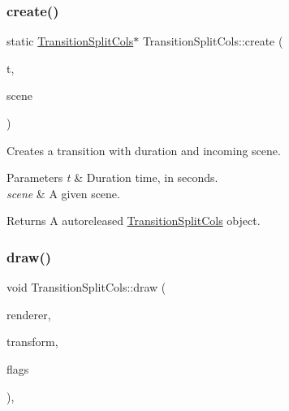 \subsubsection{\texorpdfstring{create()}{create()}\hspace{0.1cm}{\footnotesize\ttfamily [2/2]}}
{\footnotesize\ttfamily static \hyperlink{classTransitionSplitCols}{Transition\+Split\+Cols}$\ast$ Transition\+Split\+Cols\+::create (\begin{DoxyParamCaption}\item[{float}]{t,  }\item[{\hyperlink{classScene}{Scene} $\ast$}]{scene }\end{DoxyParamCaption})\hspace{0.3cm}{\ttfamily [static]}}

Creates a transition with duration and incoming scene.


\begin{DoxyParams}{Parameters}
{\em t} & Duration time, in seconds. \\
\hline
{\em scene} & A given scene. \\
\hline
\end{DoxyParams}
\begin{DoxyReturn}{Returns}
A autoreleased \hyperlink{classTransitionSplitCols}{Transition\+Split\+Cols} object. 
\end{DoxyReturn}
\mbox{\label{classTransitionSplitCols_af9a2190cb947a62c0d04544cd7db6c5e}} 
\subsubsection{\texorpdfstring{draw()}{draw()}\hspace{0.1cm}{\footnotesize\ttfamily [1/2]}}
{\footnotesize\ttfamily void Transition\+Split\+Cols\+::draw (\begin{DoxyParamCaption}\item[{\hyperlink{classRenderer}{Renderer} $\ast$}]{renderer,  }\item[{const \hyperlink{classMat4}{Mat4} \&}]{transform,  }\item[{uint32\+\_\+t}]{flags }\end{DoxyParamCaption})\hspace{0.3cm}{\ttfamily [override]}, {\ttfamily [virtual]}}

